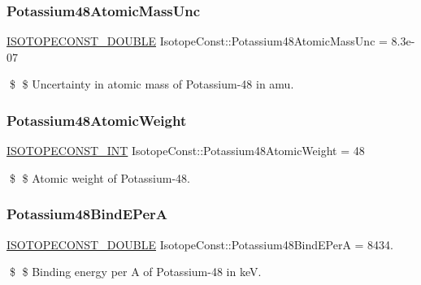\subsubsection{\texorpdfstring{Potassium48\+Atomic\+Mass\+Unc}{Potassium48AtomicMassUnc}}
{\footnotesize\ttfamily \mbox{\hyperlink{group___isotope_const-_macros_ga8f45a7272ce02c0b4c65c44636ed719a}{I\+S\+O\+T\+O\+P\+E\+C\+O\+N\+S\+T\+\_\+\+D\+O\+U\+B\+LE}} Isotope\+Const\+::\+Potassium48\+Atomic\+Mass\+Unc = 8.\+3e-\/07}

\$ \$ Uncertainty in atomic mass of Potassium-\/48 in amu. \mbox{\label{group___isotope_const-_potassium-_k48_ga00cb3aba2396e803dde90a89314e14eb}} 
\subsubsection{\texorpdfstring{Potassium48\+Atomic\+Weight}{Potassium48AtomicWeight}}
{\footnotesize\ttfamily \mbox{\hyperlink{group___isotope_const-_macros_ga5f18360b3e99483a35c32d789e62621c}{I\+S\+O\+T\+O\+P\+E\+C\+O\+N\+S\+T\+\_\+\+I\+NT}} Isotope\+Const\+::\+Potassium48\+Atomic\+Weight = 48}

\$ \$ Atomic weight of Potassium-\/48. \mbox{\label{group___isotope_const-_potassium-_k48_ga3692c1d52eefc4a8e6ea2d795556eca9}} 
\subsubsection{\texorpdfstring{Potassium48\+Bind\+E\+PerA}{Potassium48BindEPerA}}
{\footnotesize\ttfamily \mbox{\hyperlink{group___isotope_const-_macros_ga8f45a7272ce02c0b4c65c44636ed719a}{I\+S\+O\+T\+O\+P\+E\+C\+O\+N\+S\+T\+\_\+\+D\+O\+U\+B\+LE}} Isotope\+Const\+::\+Potassium48\+Bind\+E\+PerA = 8434.}

\$ \$ Binding energy per A of Potassium-\/48 in keV. \mbox{\label{group___isotope_const-_potassium-_k48_gad3e63f7aaded54cc3f8f8be47536b6fe}} 
